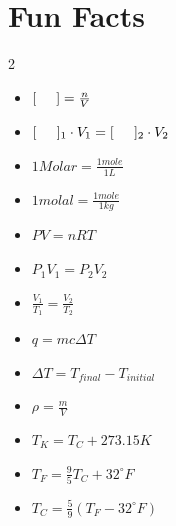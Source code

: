 \documentclass[11pt,addpoints]{exam}   	%
\begin{document}
\section*{Fun Facts}
\begin{multicols}{2}
\begin{itemize}
\item 
$ [\hspace{0.2 in}] = \frac{n}{V}$ 
\vspace{0.2in}

\item 
$ [\hspace{0.2 in}]_1 \cdot V_1=  [\hspace{0.2 in}]_2 \cdot V_2$
\vspace{0.2in}

\item 
$ 1 Molar = \frac{1 mole}{1 L}$
\vspace{0.2in}

\item 
$ 1 molal = \frac{1 mole}{1 kg}$
\vspace{0.2in}

\item 
$P V = n R T$
\vspace{0.2in}

\item 
$P_1 V_1 = P_2 V_2$
\vspace{0.2in}

\item 
$\frac{V_1}{T_1} = \frac{V_2}{T_2}$
\vspace{0.2in}

\item
$q = m c \Delta T$
\vspace{0.2in}

\item
$\Delta T = T_{final} - T_{initial}$
\vspace{0.2in}

\item
$\rho = \frac{m}{V} $
\vspace{0.2in}

\item
$T_K = T_C + 273.15 K$
\vspace{0.2in}

\item
$T_F = \frac{9}{5}T_C + 32^{\circ}F$
\vspace{0.2in}

\item
$T_C = \frac{5}{9}(T_F - 32^{\circ}F)$
\vspace{0.2in}


\end{itemize}
\end{multicols}
\end{document}
